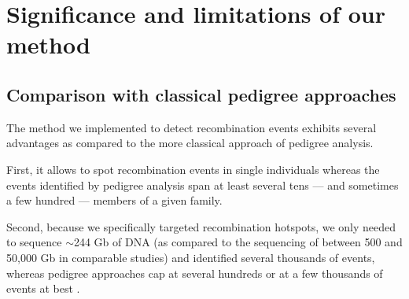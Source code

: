 
%
%


\section{Significance and limitations of our method}
\subsection{Comparison with classical pedigree approaches}

The method we implemented to detect recombination events exhibits several advantages as compared to the more classical approach of pedigree analysis.

First, it allows to spot recombination events in single individuals whereas the events identified by pedigree analysis span at least several tens — and sometimes a few hundred — members of a given family.

Second, because we specifically targeted recombination hotspots, we only needed to sequence $\sim$244 Gb of DNA (as compared to the sequencing of between 500 and 50,000 Gb in comparable studies) and identified several thousands of events, whereas pedigree approaches cap at several hundreds \citep{halldorsson2016rate,smeds2016highresolution} or at a few thousands of events at best \citep{li2018highresolution}.

